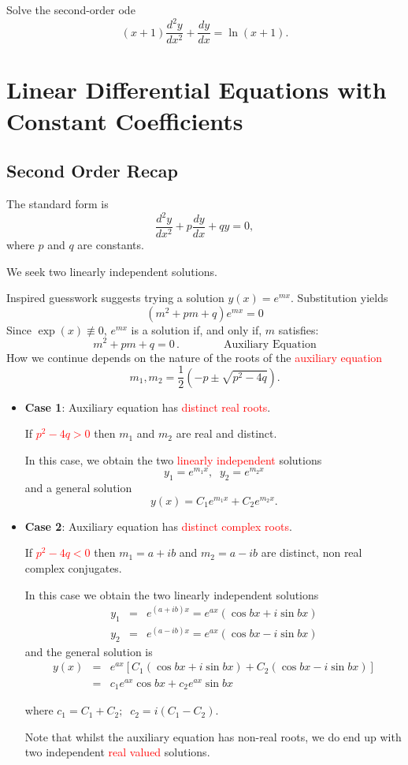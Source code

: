 \documentclass{article}
\begin{document}
 Solve the second-order ode
$$
(x+1)\frac{d^2 y}{ d x^2}+  \frac{d y}{ d x}= \ln(x+1).
$$

\newpage

\section{Linear Differential Equations with Constant Coefficients}
\subsection{Second Order Recap}
The standard form is
$$
\frac{d^2 y}{dx^2} + p \frac{dy}{dx} + q  y = 0,
$$
where $p$ and $q$ are constants. 

We seek two linearly independent solutions. 

Inspired guesswork suggests trying a solution $y(x) =e^{mx}$. Substitution yields
$$
\left(m^2+ pm + q \right)e^{mx}=0
$$
Since $\exp(x) \not\equiv 0$, $e^{mx}$ is a solution if, and only if, $m$ satisfies:
$$
m^2+ pm + q=0\,. \qquad \qquad \mbox{Auxiliary Equation}
$$
How we continue depends on the nature of the roots of the \textcolor{red}{auxiliary equation}
$$
m_1, m_2= \frac{1}{2}\left( -p \pm \sqrt{p^2- 4q} \right).
$$

\begin{itemize}
\item
\textbf{Case 1}: Auxiliary equation has \textcolor{red}{distinct real roots}.

If \textcolor{red}{$p^2- 4q>0$} then $m_1$ and $m_2$ are real and distinct. 

In this case, we obtain the two \textcolor{red}{linearly independent} solutions
$$
y_1= e^{m_1 x}, \;\; y_2= e^{m_2 x}
$$
and a general solution
$$
y(x)= C_1 e^{m_1 x} +C_2  e^{m_2 x}.
$$
\end{itemize}


\begin{itemize}
\item
\textbf{Case 2}: Auxiliary equation has \textcolor{red}{distinct complex roots}.

If \textcolor{red}{$p^2- 4q<0$} then $m_1 = a+ib$ and $m_2 = a-ib$ are distinct, non real complex conjugates.

In this case we obtain the two linearly independent solutions
$$
\begin{array}{lll}
y_1 & = & e^{(a+ib) x}=e^{a x}( \cos bx +i \sin b x) \\
y_2 & = & e^{(a-ib) x}=e^{a x}( \cos bx -i \sin b x)
\end{array}
$$
and the general solution is
$$
\begin{array}{lll}
y(x) & = & e^{a x}\left[  C_1( \cos bx +i \sin b x)+ C_2( \cos bx -i
\sin b x) \right] \\ & = & c_1 e^{a x} \cos bx +c_2 e^{ax} \sin b x
\end{array}
$$
\vspace{-5mm}

where $c_1=C_1+C_2; \;\; c_2=i(C_1-C_2)$.

Note that whilst the auxiliary equation has non-real roots, we do end up with two independent
\textcolor{red}{real valued} solutions.
\end{itemize}
\end{document}

